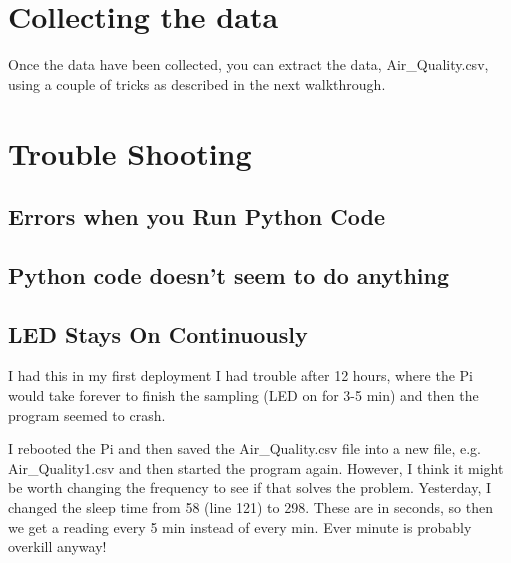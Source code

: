\documentclass{article}\usepackage[]{graphicx}\usepackage[]{color}
\begin{document}
\section{Collecting the data}

Once the data have been collected, you can extract the data, Air\_Quality.csv, using a couple of tricks as described in the next walkthrough. 

\section{Trouble Shooting}

\subsection{Errors when you Run Python Code}

\subsection{Python code doesn't seem to do anything}


\subsection{LED Stays On Continuously}

I had this in my first deployment I had trouble after 12 hours, where the Pi would take forever to finish the sampling (LED on for 3-5 min) and then the program seemed to crash. 

I rebooted the Pi and then saved the Air\_Quality.csv file into a new file, e.g. Air\_Quality1.csv and then started the program again. However, I think it might be worth changing the frequency to see if that solves the problem. Yesterday, I changed the sleep time from 58 (line 121) to 298. These are in seconds, so then we get a reading every 5 min instead of every min. Ever minute is probably overkill anyway!
\end{document}
